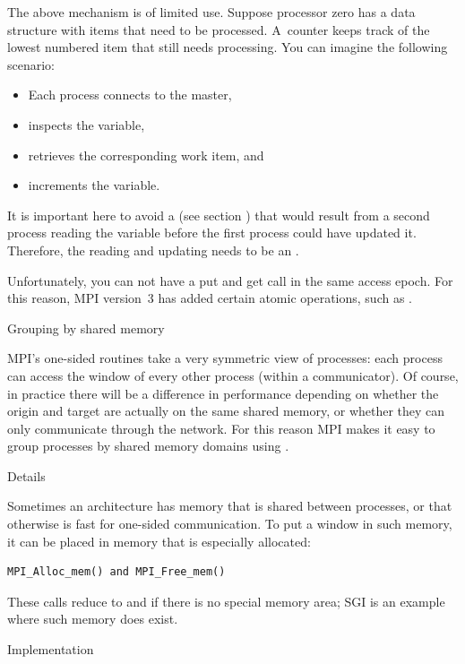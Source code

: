The above mechanism is of limited use.
Suppose processor zero has a data structure 
with items that need to be processed. A~counter 
keeps track of the lowest numbered item that still needs processing.
You can imagine the following
 scenario:
\begin{itemize}
\item Each process connects to the master,
\item inspects the  variable,
\item retrieves the corresponding work item, and
\item increments the  variable.
\end{itemize}
It is important here to avoid a 
(see section ) that would result
from a second process reading the  variable 
before the first process could have updated it. Therefore, the reading
and updating needs to be an .

Unfortunately, you can not have a put and get call in the same access
epoch. For this reason, MPI version~3 has added certain atomic
operations, such as .

 {Grouping by shared memory}
\label{mpi-comm-split-type}

MPI's one-sided routines take a very symmetric view of processes:
each process can access the window of every other process (within a communicator).
Of course, in practice there will be a difference in performance
depending on whether the origin and target are actually
on the same shared memory, or whether they can only communicate through the network.
For this reason MPI makes it easy to group processes by shared memory domains
using .

 {Details}
\label{sec:mpi-alloc}

Sometimes an architecture has memory that is shared between processes,
or that otherwise is fast for one-sided communication. To put a window
in such memory, it can be placed in memory that is especially
allocated:
\begin{verbatim}
MPI_Alloc_mem() and MPI_Free_mem()
\end{verbatim}
These calls reduce to  and  if there is no special
memory area; SGI is an example where such memory does exist.

 {Implementation}

